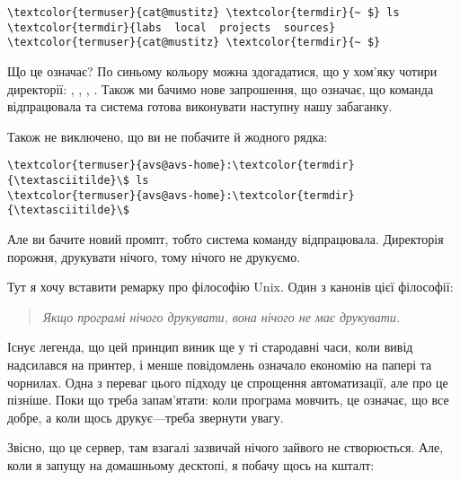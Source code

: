 \begin{Verbatim}[fontsize=\footnotesize,commandchars=\\\{\},xleftmargin=\parindent]
\textcolor{termuser}{cat@mustitz} \textcolor{termdir}{~ $} ls
\textcolor{termdir}{labs  local  projects  sources}
\textcolor{termuser}{cat@mustitz} \textcolor{termdir}{~ $}
\end{Verbatim}

Що це означає?
По синьому кольору можна здогадатися,
що у хом'яку чотири директорії: , , , .
Також ми бачимо нове запрошення,
що означає, що команда відпрацювала
та система готова виконувати наступну нашу забаганку.

Також не виключено, що ви не побачите й жодного рядка:

\begin{Verbatim}[fontsize=\footnotesize,commandchars=\\\{\},xleftmargin=\parindent]
\textcolor{termuser}{avs@avs-home}:\textcolor{termdir}{\textasciitilde}\$ ls
\textcolor{termuser}{avs@avs-home}:\textcolor{termdir}{\textasciitilde}\$
\end{Verbatim}

Але ви бачите новий промпт, тобто система команду відпрацювала.
Директорія порожня, друкувати нічого, тому нічого не друкуємо.

Тут я хочу вставити ремарку про філософію Unix.
Один з канонів цієї філософії:

\begin{quote}
\textit{Якщо програмі нічого друкувати, вона нічого не має друкувати.}
\end{quote}

Існує легенда, що цей принцип виник ще у ті стародавні часи, коли вивід надсилався на принтер,
і менше повідомлень означало економію на папері та чорнилах.
Одна з переваг цього підходу це спрощення автоматизації, але про це пізніше.
Поки що треба запам'ятати: коли програма мовчить, це означає, що все добре,
а коли щось друкує---треба звернути увагу.

Звісно, що це сервер, там взагалі зазвичай нічого зайвого не створюється.
Але, коли я запущу на домашньому десктопі, я побачу щось на кшталт:


